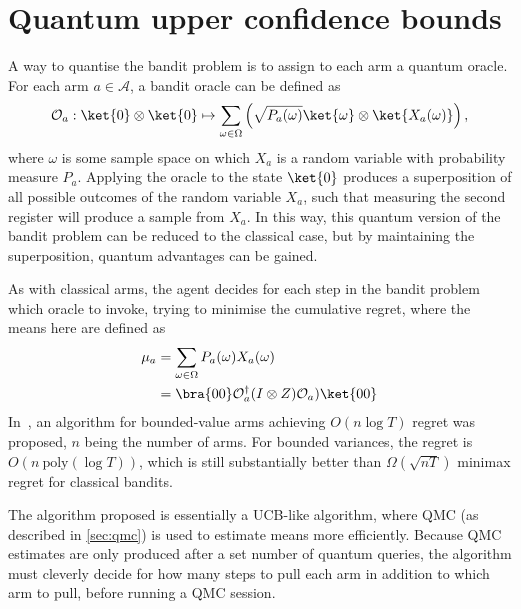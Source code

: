 \section{Quantum upper confidence bounds}
\label{sec:wan2022}
A way to quantise the bandit problem is to assign to each arm a quantum oracle.
For each arm $a \in \mathcal{A}$, a bandit oracle can be defined as
\begin{equation}
    \mathcal{O}_a: \ket{0}\otimes\ket{0} \mapsto \sum_{\omega \in \Omega} \left(\sqrt{P_a(\omega)} \ket{\omega} \otimes \ket{X_a(\omega)} \right),
    \label{eq:wan_oracle}
\end{equation}
where $\omega$ is some sample space on which $X_a$ is a random variable with probability measure $P_a$.
Applying the oracle to the state $\ket{0}$ produces a superposition of all possible outcomes of the random variable $X_a$, such that measuring the second register will produce a sample from $X_a$.
In this way, this quantum version of the bandit problem can be reduced to the classical case, but by maintaining the superposition, quantum advantages can be gained.

As with classical arms, the agent decides for each step in the bandit problem which oracle to invoke, trying to minimise the cumulative regret, where the means here are defined as
\begin{equation}
    \begin{aligned}
        \mu_a
         & = \sum_{\omega \in \Omega} P_a(\omega) X_a(\omega)                     \\
         & = \bra{00} \mathcal{O}_a^\dagger (I \otimes Z) \mathcal{O}_a) \ket{00} \\
    \end{aligned}
\end{equation}
In~\autocite{wan2022}, an algorithm for bounded-value arms achieving $O(n \log T)$ regret was proposed, $n$ being the number of arms.
For bounded variances, the regret is $O(n \ \text{poly}(\log T))$, which is still substantially better than $\Omega(\sqrt{nT})$ minimax regret for classical bandits.

The algorithm proposed is essentially a UCB-like algorithm, where QMC (as described in \cref{sec:qmc}) is used to estimate means more efficiently.
Because QMC estimates are only produced after a set number of quantum queries, the algorithm must cleverly decide for how many steps to pull each arm in addition to which arm to pull, before running a QMC session.

